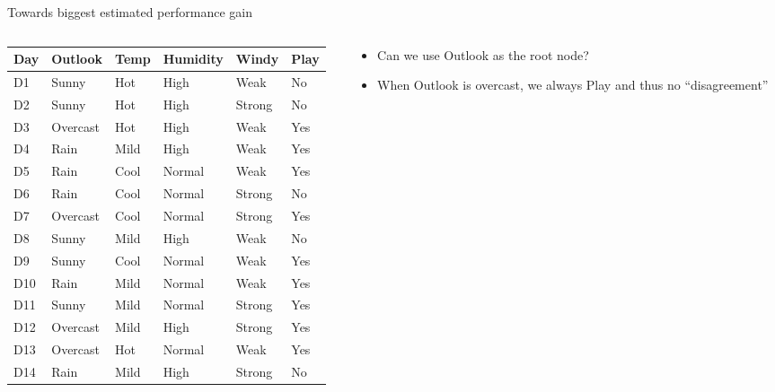 \documentclass[usenames,dvipsnames]{beamer}
\begin{document}
\begin{frame}{Towards biggest estimated performance gain}
\begin{columns}
	\begin{column}{.7\textwidth}
		
		
		\begin{scriptsize}
			

			\begin{tabular}{lllll||l} \toprule
				\textbf{Day} & \textbf{Outlook}  & \textbf{Temp} & \textbf{Humidity} & \textbf{Windy}  & \textbf{Play} \\ \midrule
				D1  & Sunny    & Hot  & High     & Weak   & No   \\
				D2  & Sunny    & Hot  & High     & Strong & No   \\
				D3  & Overcast & Hot  & High     & Weak   & Yes  \\
				D4  & Rain     & Mild & High     & Weak   & Yes  \\
				D5  & Rain     & Cool & Normal   & Weak   & Yes  \\
				D6  & Rain     & Cool & Normal   & Strong & No   \\
				D7  & Overcast & Cool & Normal   & Strong & Yes  \\
				D8  & Sunny    & Mild & High     & Weak   & No   \\
				D9  & Sunny    & Cool & Normal   & Weak   & Yes  \\
				D10 & Rain     & Mild & Normal   & Weak   & Yes  \\
				D11 & Sunny    & Mild & Normal   & Strong & Yes  \\
				D12 & Overcast & Mild & High     & Strong & Yes  \\
				D13 & Overcast & Hot  & Normal   & Weak   & Yes  \\
				D14 & Rain     & Mild & High     & Strong & No  \\ \bottomrule
			\end{tabular}
		\end{scriptsize}
	\end{column}
	\begin{column}{0.4\textwidth}
		\begin{scriptsize}
			\begin{itemize}
				\pause \item Can we use Outlook as the root node?
				\pause 	\item When Outlook is overcast, we always Play and thus no ``disagreement'' 
			\end{itemize}
			
		\end{scriptsize}
	\end{column}
	
\end{columns}

\end{frame}
	
\end{document}
